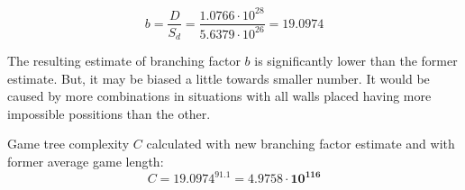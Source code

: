 \begin{equation}
  \label{eqn:brf}
  b = \frac{D}{S_d} = \frac{1.0766{\cdot}10^{28}}{5.6379{\cdot}10^{26}}
    = 19.0974
\end{equation}

The resulting estimate of branching factor $b$ is significantly lower than
the former estimate. But, it may be biased a little towards smaller number. It
would be caused by more combinations in situations with all walls placed having
more impossible possitions than the other.

Game tree complexity $C$ calculated with new branching factor estimate and
with former average game length:
\begin{equation}
  \label{eqn:gtc}
  C = 19.0974^{91.1} = \mathbf{4.9758{\cdot}10^{116}}
\end{equation}

